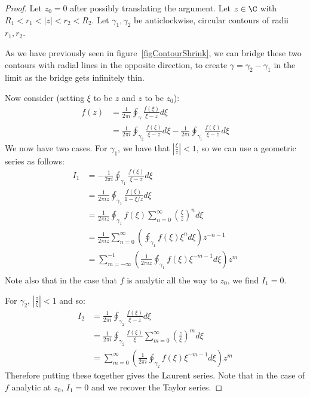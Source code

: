 \documentclass[../Main.tex]{subfiles}
\begin{document}
\begin{proof}
    Let $z_0 = 0$ after possibly translating the argument. Let $z \in \C$ with $R_1 < r_1 < |z| < r_2 < R_2$. Let $\gamma_1, \gamma_2$ be anticlockwise, circular contours of radii $r_1, r_2$.

    As we have previously seen in figure~\ref{figContourShrink}, we can bridge these two contours with radial lines in the opposite direction, to create $\gamma = \gamma_2 - \gamma_1$ in the limit as the bridge gets infinitely thin.

    Now consider  (setting $\xi$ to be $z$ and $z$ to be $z_0$):
    \begin{align*}
        f(z) &= \frac{1}{2\pi i} \oint_{\gamma} \frac{f(\xi)}{\xi - z} d\xi \\
        &= \frac{1}{2\pi i} \oint_{\gamma_2} \frac{f(\xi)}{\xi - z}d\xi - \frac{1}{2\pi i} \oint_{\gamma_1} \frac{f(\xi)}{\xi - z} d\xi
    \end{align*}
    We now have two cases. For $\gamma_1$, we have that $\left|\frac{\xi}{z}\right| < 1$, so we can use a geometric series as follows:
    \begin{align*}
        I_1 &= -\frac{1}{2\pi i} \oint_{\gamma_1} \frac{f(\xi)}{\xi - z} d\xi \\
        &= \frac{1}{2\pi i z} \oint_{\gamma_1} \frac{f(\xi)}{1 - \xi / z} d\xi \\
        &= \frac{1}{2\pi i z} \oint_{\gamma_1} f(\xi) \sum_{n=0}^{\infty} \left(\frac{\xi}{z}\right)^n d\xi \\
        &= \frac{1}{2\pi i z} \sum_{n=0}^{\infty} \left(\oint_{\gamma_1} f(\xi) \xi^n d\xi\right)z^{-n-1} \\
        &=\sum_{m=-\infty}^{-1} \left(\frac{1}{2\pi i z} \oint_{\gamma_1} f(\xi) \xi^{-m-1} d\xi\right)z^m \\
    \end{align*}
    Note also that in the case that $f$ is analytic all the way to $z_0$, we find $I_1 = 0$.
    
    For $\gamma_2$, $\left|\frac{z}{\xi}\right|<1$ and so:
    \begin{align*}
        I_2 &= \frac{1}{2\pi i} \oint_{\gamma_2} \frac{f(\xi)}{\xi - z}d\xi \\
        &= \frac{1}{2\pi i} \oint_{\gamma_2} \frac{f(\xi)}{\xi}\sum_{m=0}^{\infty} \left(\frac{z}{\xi}\right)^m d\xi \\
        &= \sum_{m=0}^{\infty} \left(\frac{1}{2\pi i} \oint_{\gamma_2} f(\xi) \xi^{-m-1} d\xi\right)z^m
    \end{align*}
    Therefore putting these together gives the Laurent series. Note that in the case of $f$ analytic at $z_0$, $I_1 = 0$ and we recover the Taylor series.
\end{proof}
\end{document}
